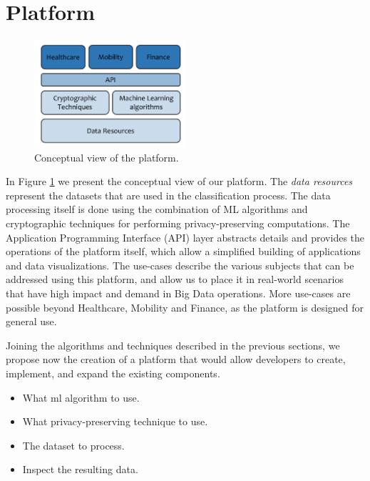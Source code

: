 
\section{Platform}
\label{sec:components}



\begin{figure}[!h]
 \centering
  \includegraphics[width=0.5\textwidth]{images/conceptual_view_of_the_platform.pdf}
  \caption{Conceptual view of the platform.}
  \label{fig:ConceptView}
\end{figure}

In Figure \ref{fig:ConceptView} we present the conceptual view of our platform. 
The \emph{data resources} represent the datasets that are used in the classification process. 
The data processing itself is done using the combination of ML algorithms and cryptographic techniques for performing privacy-preserving computations. 
The Application Programming Interface (API) layer abstracts details and provides the operations of the platform itself, which allow a simplified building of applications and data visualizations.
The use-cases describe the various subjects that can be addressed using this platform, and allow us to place it in real-world scenarios that have high impact and demand in Big Data operations. More use-cases are possible beyond Healthcare, Mobility and Finance, as the platform is designed for general use.


Joining the algorithms and techniques described in the previous sections, we propose now the creation of a platform that would allow developers to create, implement, and expand the existing components. 


\begin{itemize}
  \item What \ac{ml} algorithm to use.
  \item What privacy-preserving technique to use.
  \item The dataset to process.
  \item Inspect the resulting data.
\end{itemize}



